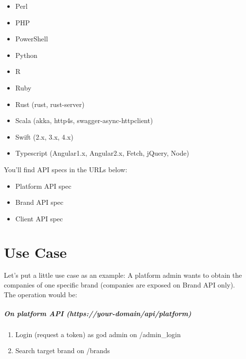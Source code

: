 \documentclass[letterpaper,10pt,english]{sphinxmanual}
\begin{document}
\begin{itemize}
\item {} 
Perl

\item {} 
PHP

\item {} 
PowerShell

\item {} 
Python

\item {} 
R

\item {} 
Ruby

\item {} 
Rust (rust, rust-server)

\item {} 
Scala (akka, http4s, swagger-async-httpclient)

\item {} 
Swift (2.x, 3.x, 4.x)

\item {} 
Typescript (Angular1.x, Angular2.x, Fetch, jQuery, Node)

\end{itemize}

You'll find API specs in the URLs below:
\begin{itemize}
\item {} 
Platform API spec

\item {} 
Brand API spec

\item {} 
Client API spec

\end{itemize}


\chapter{Use Case}
\label{api_rest/use_case:use-case}\label{api_rest/use_case::doc}\label{api_rest/use_case:id1}
Let's put a little use case as an example: A platform admin wants to obtain the companies of one specific brand (companies are exposed on Brand API only). The operation would be:
\paragraph{On platform API (https://your-domain/api/platform)}
\begin{enumerate}
\item {} 
Login (request a token) as god admin on /admin\_login

\item {} 
Search target brand on /brands

\end{enumerate}
\end{document}

